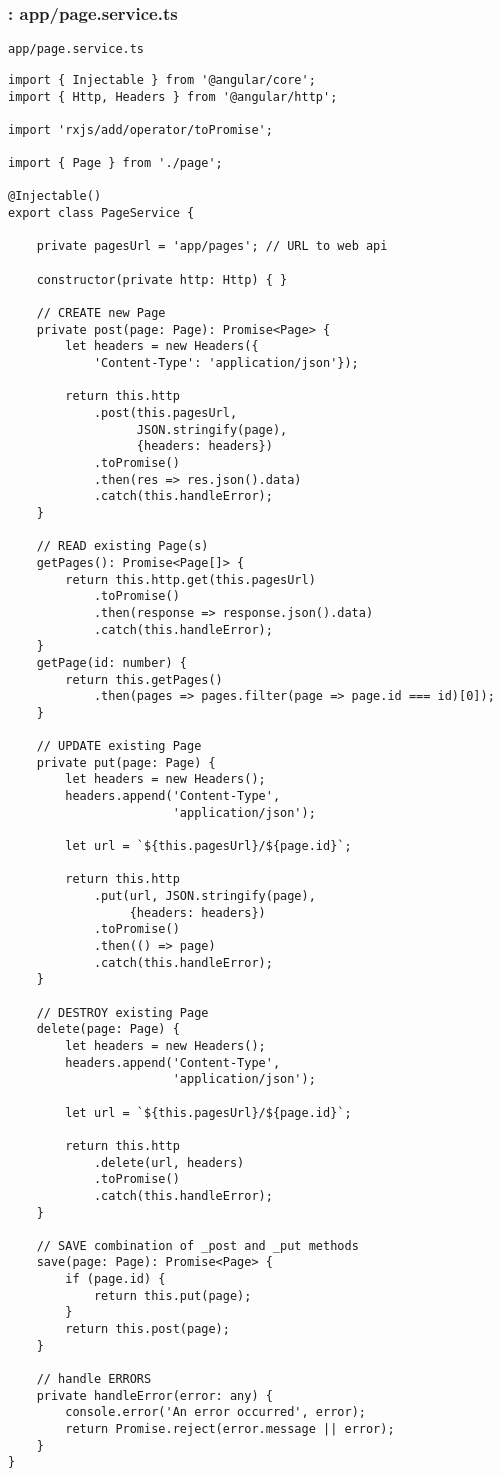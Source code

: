 \documentclass[11pt]{article}
\begin{document}
\subsubsection{: app/page.service.ts}
\label{sec-2-5-4}
\begin{verbatim}
app/page.service.ts
\end{verbatim}
\begin{verbatim}
import { Injectable } from '@angular/core';
import { Http, Headers } from '@angular/http';

import 'rxjs/add/operator/toPromise';

import { Page } from './page';

@Injectable()
export class PageService {

    private pagesUrl = 'app/pages'; // URL to web api

    constructor(private http: Http) { }

    // CREATE new Page
    private post(page: Page): Promise<Page> {
        let headers = new Headers({
            'Content-Type': 'application/json'});

        return this.http
            .post(this.pagesUrl,
                  JSON.stringify(page),
                  {headers: headers})
            .toPromise()
            .then(res => res.json().data)
            .catch(this.handleError);
    }

    // READ existing Page(s)
    getPages(): Promise<Page[]> {
        return this.http.get(this.pagesUrl)
            .toPromise()
            .then(response => response.json().data)
            .catch(this.handleError);
    }
    getPage(id: number) {
        return this.getPages()
            .then(pages => pages.filter(page => page.id === id)[0]);
    }

    // UPDATE existing Page
    private put(page: Page) {
        let headers = new Headers();
        headers.append('Content-Type',
                       'application/json');

        let url = `${this.pagesUrl}/${page.id}`;

        return this.http
            .put(url, JSON.stringify(page),
                 {headers: headers})
            .toPromise()
            .then(() => page)
            .catch(this.handleError);
    }

    // DESTROY existing Page
    delete(page: Page) {
        let headers = new Headers();
        headers.append('Content-Type',
                       'application/json');

        let url = `${this.pagesUrl}/${page.id}`;

        return this.http
            .delete(url, headers)
            .toPromise()
            .catch(this.handleError);
    }

    // SAVE combination of _post and _put methods
    save(page: Page): Promise<Page> {
        if (page.id) {
            return this.put(page);
        }
        return this.post(page);
    }

    // handle ERRORS
    private handleError(error: any) {
        console.error('An error occurred', error);
        return Promise.reject(error.message || error);
    }
}
\end{verbatim}
\end{document}
